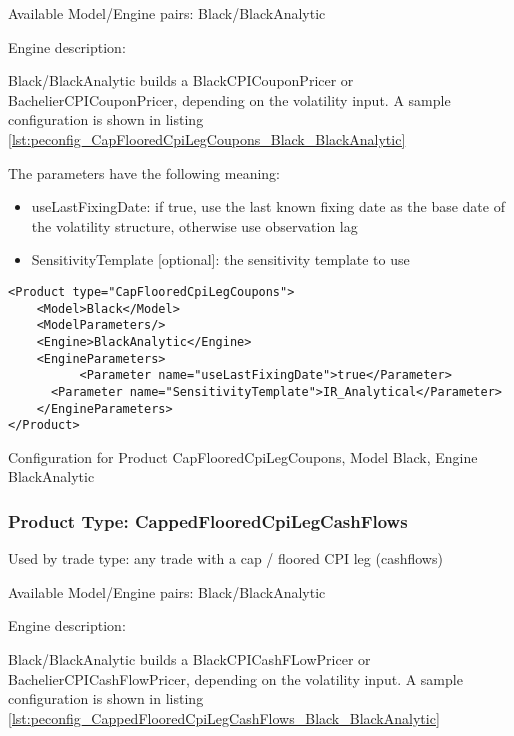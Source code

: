 Available Model/Engine pairs: Black/BlackAnalytic

Engine description:

Black/BlackAnalytic builds a BlackCPICouponPricer or BachelierCPICouponPricer, depending on the volatility input. A sample configuration is
shown in listing \ref{lst:peconfig_CapFlooredCpiLegCoupons_Black_BlackAnalytic}

The parameters have the following meaning:

\begin{itemize}
\item useLastFixingDate: if true, use the last known fixing date as the base date of the volatility structure, otherwise
  use observation lag        
\item SensitivityTemplate [optional]: the sensitivity template to use 
\end{itemize}

\begin{longlisting}
\begin{verbatim}
<Product type="CapFlooredCpiLegCoupons">
    <Model>Black</Model>
    <ModelParameters/>
    <Engine>BlackAnalytic</Engine>
    <EngineParameters>
          <Parameter name="useLastFixingDate">true</Parameter>
      <Parameter name="SensitivityTemplate">IR_Analytical</Parameter>
    </EngineParameters>
</Product>
\end{verbatim}
\caption{Configuration for Product CapFlooredCpiLegCoupons, Model Black, Engine BlackAnalytic}
\label{lst:peconfig_CapFlooredCpiLegCoupons_Black_BlackAnalytic}
\end{longlisting}

\subsubsection{Product Type: CappedFlooredCpiLegCashFlows}

Used by trade type: any trade with a cap / floored CPI leg (cashflows)

Available Model/Engine pairs: Black/BlackAnalytic

Engine description:

Black/BlackAnalytic builds a BlackCPICashFLowPricer or BachelierCPICashFlowPricer, depending on the volatility input. A sample configuration is
shown in listing \ref{lst:peconfig_CappedFlooredCpiLegCashFlows_Black_BlackAnalytic}

